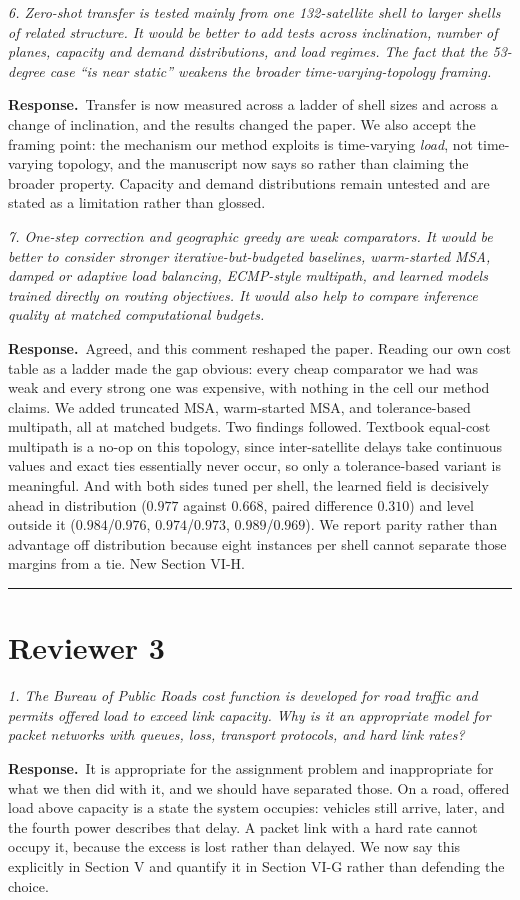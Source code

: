 \documentclass[11pt]{article}
\newcommand{\rc}[1]{\medskip\noindent\textit{\textcolor{black!65}{#1}}\par\smallskip}
\newcommand{\ans}{\noindent\textbf{Response.}\ }
\begin{document}
\rc{6. Zero-shot transfer is tested mainly from one 132-satellite shell to larger shells of related
structure. It would be better to add tests across inclination, number of planes, capacity and
demand distributions, and load regimes. The fact that the 53-degree case ``is near static'' weakens
the broader time-varying-topology framing.}
\ans Transfer is now measured across a ladder of shell sizes and across a change of inclination,
and the results changed the paper. We also accept the framing point: the mechanism our method
exploits is time-varying \emph{load}, not time-varying topology, and the manuscript now says so
rather than claiming the broader property. Capacity and demand distributions remain untested and
are stated as a limitation rather than glossed.

\rc{7. One-step correction and geographic greedy are weak comparators. It would be better to
consider stronger iterative-but-budgeted baselines, warm-started MSA, damped or adaptive load
balancing, ECMP-style multipath, and learned models trained directly on routing objectives. It
would also help to compare inference quality at matched computational budgets.}
\ans Agreed, and this comment reshaped the paper. Reading our own cost table as a ladder made the
gap obvious: every cheap comparator we had was weak and every strong one was expensive, with
nothing in the cell our method claims. We added truncated MSA, warm-started MSA, and
tolerance-based multipath, all at matched budgets. Two findings followed. Textbook equal-cost
multipath is a no-op on this topology, since inter-satellite delays take continuous values and
exact ties essentially never occur, so only a tolerance-based variant is meaningful. And with both
sides tuned per shell, the learned field is decisively ahead in distribution ($0.977$ against
$0.668$, paired difference $0.310$) and level outside it ($0.984$/$0.976$, $0.974$/$0.973$,
$0.989$/$0.969$). We report parity rather than advantage off distribution because eight instances
per shell cannot separate those margins from a tie. New Section VI-H.

\hrule
\section*{Reviewer 3}

\rc{1. The Bureau of Public Roads cost function is developed for road traffic and permits offered
load to exceed link capacity. Why is it an appropriate model for packet networks with queues, loss,
transport protocols, and hard link rates?}
\ans It is appropriate for the assignment problem and inappropriate for what we then did with it,
and we should have separated those. On a road, offered load above capacity is a state the system
occupies: vehicles still arrive, later, and the fourth power describes that delay. A packet link
with a hard rate cannot occupy it, because the excess is lost rather than delayed. We now say this
explicitly in Section V and quantify it in Section VI-G rather than defending the choice.
\end{document}
